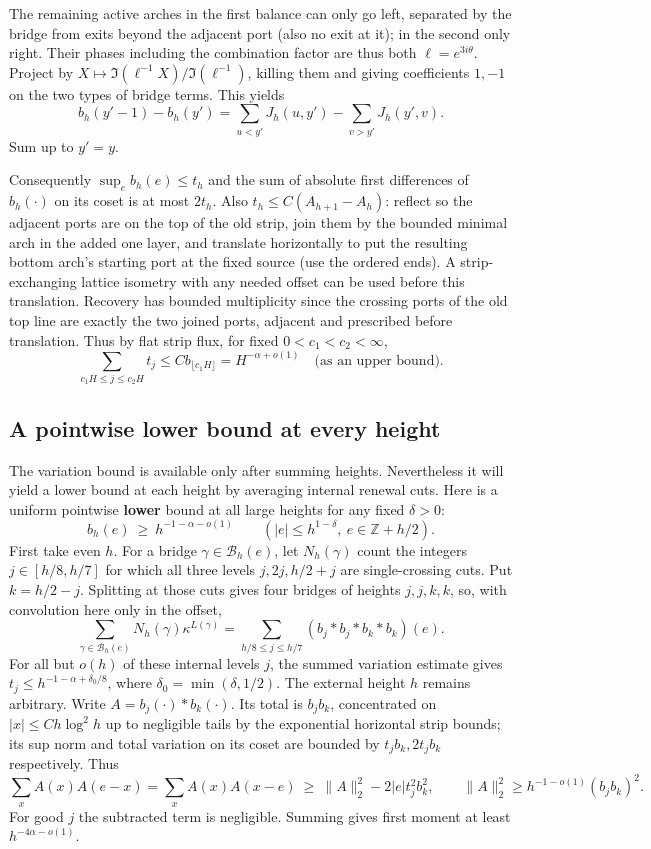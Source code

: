 The remaining active arches in the first balance can only go left, separated by the bridge from exits beyond the adjacent port (also no exit at it); in the second only right. Their phases including the combination factor are thus both \(\ell=e^{3i\theta}\). Project by \(X\mapsto \Im(\ell^{-1}X)/\Im(\ell^{-1})\), killing them and giving coefficients \(1,-1\) on the two types of bridge terms. This yields
\[
 b_h(y'-1)-b_h(y')=\sum_{u<y'}J_h(u,y')-\sum_{v>y'}J_h(y',v).
\]
Sum up to \(y'=y\).

Consequently \(\sup_e b_h(e)\le t_h\) and the sum of absolute first differences of \(b_h(\cdot)\) on its coset is at most \(2t_h\). Also
\(t_h\le C(A_{h+1}-A_h)\): reflect so the adjacent ports are on the top of the old strip, join them by the bounded minimal arch in the added one layer, and translate horizontally to put the resulting bottom arch's starting port at the fixed source (use the ordered ends). A strip-exchanging lattice isometry with any needed offset can be used before this translation. Recovery has bounded multiplicity since the crossing ports of the old top line are exactly the two joined ports, adjacent and prescribed before translation. Thus by flat strip flux, for fixed \(0<c_1<c_2<\infty\),
\[
 \sum_{c_1 H\le j\le c_2 H} t_j \le C b_{\lfloor c_1H\rfloor}=H^{-\alpha+o(1)}\quad\text{(as an upper bound)} .
\]

\subsection{A pointwise lower bound at every height}
The variation bound is available only after summing heights. Nevertheless
it will yield a lower bound at each height by averaging internal renewal
cuts. Here is a uniform pointwise \textbf{lower} bound at all large heights for any fixed \(\delta>0\):
\[
 b_h(e)\ \ge\ h^{-1-\alpha-o(1)} \qquad (|e|\le h^{1-\delta},\ e\in\mathbb Z+h/2).
\]
First take even \(h\). For a bridge \(\gamma\in\mathcal B_h(e)\), let
\(N_h(\gamma)\) count the integers \(j\in[h/8,h/7]\) for which all
three levels \(j,2j,h/2+j\) are single-crossing cuts. Put
\(k=h/2-j\). Splitting at those cuts gives four bridges of heights
\(j,j,k,k\), so, with convolution here only in the offset,
\[
 \sum_{\gamma\in\mathcal B_h(e)}N_h(\gamma)\kappa^{L(\gamma)}
 =\sum_{h/8\le j\le h/7}(b_j*b_j*b_k*b_k)(e).
\]
For all but \(o(h)\) of these internal levels \(j\), the summed
variation estimate gives \(t_j\le h^{-1-\alpha+\delta_0/8}\), where
\(\delta_0=\min(\delta,1/2)\). The external height \(h\) remains
arbitrary. Write \(A=b_j(\cdot)*b_k(\cdot)\). Its total is
\(b_j b_k\), concentrated on \(|x|\le Ch\log^2 h\) up to negligible
tails by the exponential horizontal strip bounds; its sup norm and total
variation on its coset are bounded by \(t_j b_k,2t_j b_k\)
respectively. Thus
\[
 \sum_x A(x)A(e-x)
 =\sum_x A(x)A(x-e)\ \ge\ \|A\|_2^2-2|e|t_j^2 b_k^2,
 \qquad
 \|A\|_2^2\ge h^{-1-o(1)}(b_jb_k)^2.
\]
For good \(j\) the subtracted term is negligible. Summing gives first moment at least \(h^{-4\alpha-o(1)}\).

